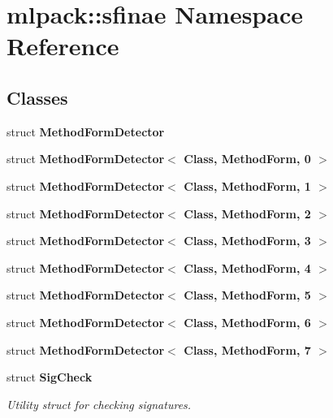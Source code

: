 \section{mlpack\+:\+:sfinae Namespace Reference}
\label{namespacemlpack_1_1sfinae}
\subsection*{Classes}
\begin{DoxyCompactItemize}
\item 
struct \textbf{ Method\+Form\+Detector}
\item 
struct \textbf{ Method\+Form\+Detector$<$ Class, Method\+Form, 0 $>$}
\item 
struct \textbf{ Method\+Form\+Detector$<$ Class, Method\+Form, 1 $>$}
\item 
struct \textbf{ Method\+Form\+Detector$<$ Class, Method\+Form, 2 $>$}
\item 
struct \textbf{ Method\+Form\+Detector$<$ Class, Method\+Form, 3 $>$}
\item 
struct \textbf{ Method\+Form\+Detector$<$ Class, Method\+Form, 4 $>$}
\item 
struct \textbf{ Method\+Form\+Detector$<$ Class, Method\+Form, 5 $>$}
\item 
struct \textbf{ Method\+Form\+Detector$<$ Class, Method\+Form, 6 $>$}
\item 
struct \textbf{ Method\+Form\+Detector$<$ Class, Method\+Form, 7 $>$}
\item 
struct \textbf{ Sig\+Check}
\begin{DoxyCompactList}\small\item\em Utility struct for checking signatures. \end{DoxyCompactList}\end{DoxyCompactItemize}
